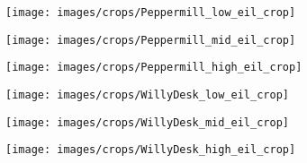 \documentclass{egpubl}
\begin{document}
\begin{figure*}[htb]
    \begin{subfigure}[t]{0.13\linewidth}
        \centering
        \texttt{[image: images/crops/Peppermill\_low\_eil\_crop]}
    \end{subfigure}
    \begin{subfigure}[t]{0.13\linewidth}
        \centering
        \texttt{[image: images/crops/Peppermill\_mid\_eil\_crop]}
    \end{subfigure}
    \begin{subfigure}[t]{0.13\linewidth}
        \centering
        \texttt{[image: images/crops/Peppermill\_high\_eil\_crop]}
    \end{subfigure}
    \begin{subfigure}[t]{0.13\linewidth}
        \centering
        \texttt{[image: images/crops/WillyDesk\_low\_eil\_crop]}
    \end{subfigure}
    \begin{subfigure}[t]{0.13\linewidth}
        \centering
        \texttt{[image: images/crops/WillyDesk\_mid\_eil\_crop]}
    \end{subfigure}
    \begin{subfigure}[t]{0.13\linewidth}
        \centering
        \texttt{[image: images/crops/WillyDesk\_high\_eil\_crop]}
    \end{subfigure}



\end{figure*}
\end{document}
